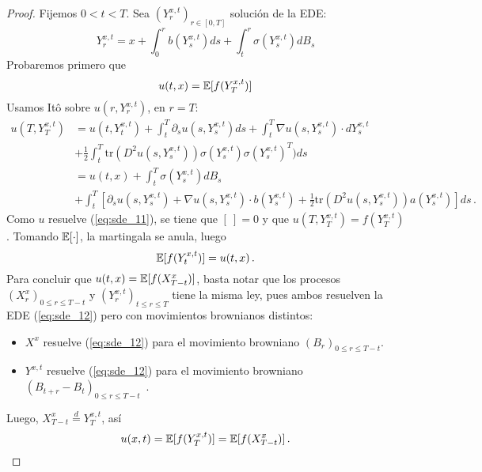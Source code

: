  \begin{proof}
\gris
Fijemos $0 < t < T$. Sea $(Y_{r}^{x,t})_{r \in [0,T]}$ solución de la EDE: 
\begin{equation*}
     Y_{r}^{x,t} = x + \int_{0}^{r} b(Y_{s}^{x,t})ds + \int_{t}^{r} \sigma (Y_{s}^{x,t}) dB_s
\end{equation*}
Probaremos primero que
\begin{equation*}
    u(t,x) = \mathbb{E} [f (Y_T^{x,t})]
\end{equation*}
Usamos It\^{o} sobre $u(r,Y_r^{x,t})$, en $r = T$:
\begin{align*}
     u(T, Y_T^{x,t}) & =  u(t,Y_t^{x,t}) + \int_{t}^{T} \partial_s u(s,Y_s^{x,t}) ds + \int_{t}^{T} \nabla u (s, Y_s^{x,t}) \cdot dY_s^{x,t} \\
      & + \frac{1}{2} \int_{t}^{T} \text{tr} (D^2 u(s,Y_s^{x,t})) \sigma(Y_s^{x,t})\sigma(Y_s^{x,t})^{T}) ds \\ 
     & = u(t,x) + \int_{t}^{T} \sigma(Y_s^{x,t}) dB_s \\
     & + \int_{t}^{T} \left[\partial_s u (s, Y_s^{x,t}) + \nabla u(s,Y_s^{x,t}) \cdot  b(Y_s^{x,t}) + \frac{1}{2} \text{tr}(D^2 u (s, Y_s^{x,t}))a(Y_s^{x,t})\right] ds \,.
\end{align*}
Como $u$ resuelve (\ref{eq:sde_11}), se tiene que $[ ~ ] = 0$ y que $u(T,Y_{T}^{x,t}) = f(Y_T^{x,t})$. Tomando $\mathbb{E}[\cdot]$, la martingala se anula, luego 
\begin{equation*}
     \mathbb{E} [f(Y_{t}^{x,t})] = u(t,x) \,.
\end{equation*}
Para concluir que $u(t,x) = \mathbb{E} [f(X_{T-t}^{x})]$, basta notar que los procesos $(X_r^{x})_{0 \le r \le T-t}$ y $(Y_r^{x,t})_{t \le  r \le T}$ tiene la misma ley, pues ambos resuelven la EDE (\ref{eq:sde_12}) pero con movimientos brownianos distintos: 
\begin{itemize}
    \item $X^x$ resuelve (\ref{eq:sde_12}) para el movimiento browniano $(B_{r})_{0 \le r \le T - t}$. 
    \item $Y^{x,t}$ resuelve (\ref{eq:sde_12}) para el movimiento browniano $(B_{t+r} - B_t)_{0 \le  r \le  T-t}$ \,.
\end{itemize}
Luego, $X_{T-t}^{x} \stackrel{d}{=} Y_{T}^{x,t}$,  así
\begin{equation*}
    u(x,t) = \mathbb{E} [f(Y_{T}^{x,t})] = \mathbb{E} [f(X_{T-t}^{x})] \,.
\end{equation*}
\findem
\negro
\end{proof}

